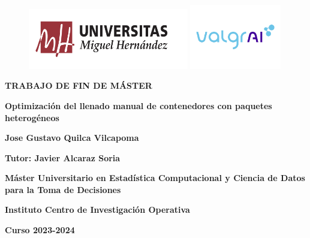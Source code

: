 \documentclass[openany]{article}
\begin{document}

\thispagestyle{empty}

\begin{titlepage}
    \begin{figure}[th]
        \begin{flushleft}
            \includegraphics[width=7cm]{Figures/image1.png}
            \includegraphics[width=4cm]{Figures/valgrai.jpeg}
        \end{flushleft}
    \end{figure}
    \vspace{1cm}

    {\flushleft \LARGE \bfseries TRABAJO DE FIN DE MÁSTER\par}\vspace{2cm}

    {\flushright \LARGE \bfseries Optimización del llenado manual de contenedores con paquetes heterogéneos  \par}\vspace{2cm}

    {\flushleft \LARGE \bfseries Jose Gustavo Quilca Vilcapoma \par}\vspace{1cm}

    {\flushleft \Large \bfseries Tutor: Javier Alcaraz Soria \par}\vspace{1.5cm}

    {\flushleft \bfseries Máster Universitario en Estadística Computacional y Ciencia de Datos para la Toma de Decisiones\par}\vspace{0.cm}
    {\flushleft \bfseries Instituto Centro de Investigación Operativa\par}\vspace{1cm}

    {\flushleft \small \bfseries Curso 2023-2024\par}\vspace{2cm}


\end{titlepage}
\end{document}
